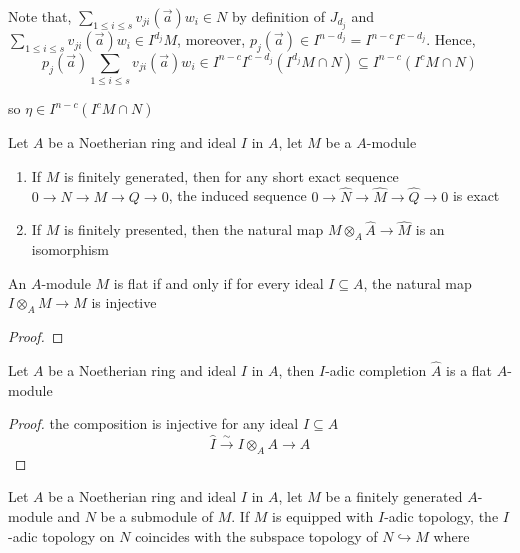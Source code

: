 \begin{longproof}
	Note that, $\sum_{1 \leq i \leq s} v_{ji}(\vec{a}) w_i \in N$ by definition of $J_{d_j}$ and $\sum_{1 \leq i \leq s} v_{ji}(\vec{a}) w_i \in I^{d_j} M$, moreover, $p_j(\vec{a}) \in I^{n - d_j} = I^{n-c} I^{c - d_j}$. Hence, 
	$$
		p_j(\vec{a}) \sum_{1 \leq i \leq s} v_{ji}(\vec{a}) w_i \in I^{n-c} I^{c - d_j} (I^{d_j} M \cap N) \subseteq I^{n-c} (I^c M \cap N)
	$$
	
	so $\eta \in I^{n-c} (I^c M \cap N)$ 
\end{longproof}


\begin{corollary}
	Let $A$ be a Noetherian ring and ideal $I$ in $A$, let $M$ be a $A$-module
	\begin{enumerate}
		\item If $M$ is finitely generated, then for any short exact sequence $0 \to N \to M \to Q \to 0$, the induced sequence $0 \to \hat{N} \to \hat{M} \to \hat{Q} \to 0$ is exact
		\item If $M$ is finitely presented, then the natural map $M \otimes_A \hat{A} \to \hat{M}$ is an isomorphism
	\end{enumerate}
\end{corollary}

\begin{proposition}
	An $A$-module $M$ is flat if and only if for every ideal $I \subseteq A$, the natural map $I \otimes_A M \to M$ is injective
\end{proposition}

\begin{proof}
\end{proof}

\begin{theorem}
	Let $A$ be a Noetherian ring and ideal $I$ in $A$, then $I$-adic completion $\hat{A}$ is a flat $A$-module
\end{theorem}

\begin{proof}
	the composition is injective for any ideal $I \subseteq A$
	$$
		\hat{I} \xrightarrow{\sim} I \otimes_A A \to \hat{A}
	$$
\end{proof}

\begin{theorem}
	Let $A$ be a Noetherian ring and ideal $I$ in $A$, let $M$ be a finitely generated $A$-module and $N$ be a submodule of $M$. If $M$ is equipped with $I$-adic topology,  the $I$-adic topology on $N$ coincides with the subspace topology of $N \hookrightarrow M$ where 
\end{theorem}

